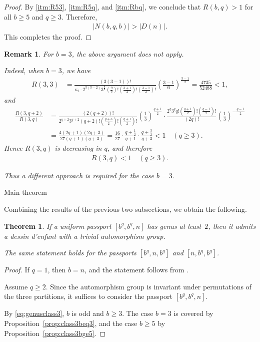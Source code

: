 \documentclass[12pt,reqno]{amsart}
\makeatletter
\newif\if@noindentafterheading
\renewcommand\subsection{\@startsection{subsection}{2}{\z@}%
  {-2.5ex \@plus -.3ex \@minus -.2ex}%
  {1.5ex \@plus .2ex}%
  {\normalfont\bfseries}%
}
\let\orig@subsection\subsection
\renewcommand\subsection{%
  \@ifstar{\subsection@star}{\subsection@nostar}%
}
\newcommand\subsection@nostar{%
  \@ifnextchar[{\subsection@opt}{\subsection@noopt}%
}
\newcommand\subsection@opt[2][]{%
  \global\@noindentafterheadingtrue
  \orig@subsection[#1]{#2}%
  \global\@noindentafterheadingfalse
}
\newcommand\subsection@noopt[1]{%
  \global\@noindentafterheadingtrue
  \orig@subsection{#1}%
  \global\@noindentafterheadingfalse
}
\newcommand\subsection@star[1]{%
  \global\@noindentafterheadingtrue
  \orig@subsection*{#1}%
  \global\@noindentafterheadingfalse
}
\newcommand{\q}{\quad}									%
\newcommand{\f}[2]{\frac{#1}{#2}}							%
\newcommand{\vt}[1]{\left\lvert #1 \right\rvert}					%
\theoremstyle{mythmstyle}
\newtheorem{thm}[lemma]{Theorem}
\theoremstyle{mydefstyle}
\newtheorem{rem}[lemma]{Remark}
\newcommand{\propref}[1]{Proposition~\ref{#1}}
\newcommand{\dde}{dessin d'enfant\xspace}
\numberwithin{equation}{section}
\newcommand{\thmclassthree}{If a uniform passport $[b^{q}, b^{q}, n]$ has genus at least~$2$, then it admits a \dde with a trivial automorphism group.

The same statement holds for the passports $[b^{q}, n, b^{q}]$ and $[n, b^{q}, b^{q}]$.}
\makeatother
\begin{document}
\begin{proof}
By \ref{itm:R53}, \ref{itm:R5q}, and \ref{itm:Rbq}, we conclude that $R(b, q) > 1$
for all $b \ge 5$ and $q \ge 3$. Therefore,
\begin{align}
\vt{N(b, q, b)} > \vt{D(n)}.
\end{align}
This completes the proof.
\end{proof}

\begin{rem}
For $b = 3$, the above argument does not apply.

Indeed, when $b = 3$, we have
\begin{align}
R(3, 3) &= \f{(3(3-1))!}{\kappa_{2}\cdot 2^{3(3-2)}3^{\f{9}{3}}\left(\f{9}{3}\right)!\left(\f{3+1}{2}\right)!\left(\f{3-1}{2}\right)!}\left(\f{3-1}{6}\right)^{\f{3-1}{2}} = \f{4735}{52488} < 1,
\end{align}
and
\begin{align}
\f{R(3, q+2)}{R(3, q)} &= \f{(2(q+2))!}{2^{q+2}3^{q+2}(q+2)!\left(\f{q+3}{2}\right)!\left(\f{q+1}{2}\right)!}\left(\f{1}{3}\right)^{\f{q+1}{2}}
\cdot \f{2^{q}3^{q}q!\left(\f{q+1}{2}\right)!\left(\f{q-1}{2}\right)!}{(2q)!}\left(\f{1}{3}\right)^{-\f{q-1}{2}} \\
&= \f{4(2q+1)(2q+3)}{27(q+1)(q+3)} = \f{16}{27}\cdot\f{q+\f{1}{2}}{q+1}\cdot\f{q+\f{3}{2}}{q+3} < 1 \q (q \ge 3).
\end{align}
Hence $R(3, q)$ is decreasing in $q$, and therefore
\begin{align}
R(3, q) < 1 \q (q \ge 3).
\end{align}

Thus a different approach is required for the case $b = 3$.
\end{rem}

\subsection{Main theorem}

Combining the results of the previous two subsections, we obtain the following.

\begin{thm}
\label{thm:class3}
\thmclassthree
\end{thm}

\begin{proof}
If $q=1$, then $b=n$, and the statement follows from
\cite[Proposition~7.1]{Ohnishi26}.

Assume $q\ge2$.
Since the automorphism group is invariant under permutations of the three partitions,
it suffices to consider the passport $[b^{q}, b^{q}, n]$.

By \eqref{eq:genusclass3}, $b$ is odd and $b\ge3$.
The case $b=3$ is covered by \propref{prop:class3beq3},
and the case $b\ge5$ by \propref{prop:class3bge5}.
\end{proof}
\end{document}
